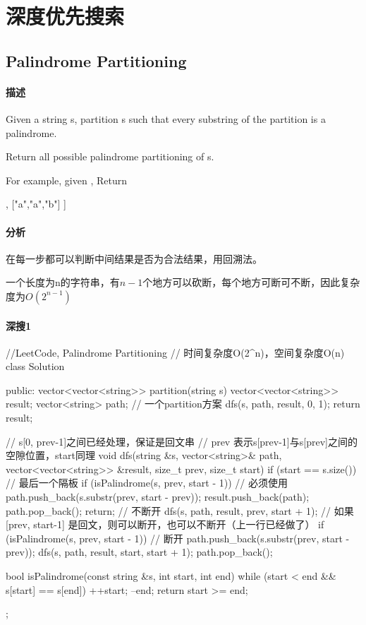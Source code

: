 ﻿\chapter{深度优先搜索}


\section{Palindrome Partitioning} %
\label{sec:palindrome-partitioning}


\subsubsection{描述}
Given a string s, partition s such that every substring of the partition is a palindrome.

Return all possible palindrome partitioning of s.

For example, given ,
Return
\begin{Code}
  [
    ["aa","b"],
    ["a","a","b"]
  ]
\end{Code}


\subsubsection{分析}
在每一步都可以判断中间结果是否为合法结果，用回溯法。

一个长度为n的字符串，有$n-1$个地方可以砍断，每个地方可断可不断，因此复杂度为$O(2^{n-1})$


\subsubsection{深搜1}
\begin{Code}
//LeetCode, Palindrome Partitioning
// 时间复杂度O(2^n)，空间复杂度O(n)
class Solution {
public:
    vector<vector<string>> partition(string s) {
        vector<vector<string>> result;
        vector<string> path;  // 一个partition方案
        dfs(s, path, result, 0, 1);
        return result;
    }

    // s[0, prev-1]之间已经处理，保证是回文串
    // prev 表示s[prev-1]与s[prev]之间的空隙位置，start同理
    void dfs(string &s, vector<string>& path,
            vector<vector<string>> &result, size_t prev, size_t start) {
        if (start == s.size()) { // 最后一个隔板
            if (isPalindrome(s, prev, start - 1)) { // 必须使用
                path.push_back(s.substr(prev, start - prev));
                result.push_back(path);
                path.pop_back();
            }
            return;
        }
        // 不断开
        dfs(s, path, result, prev, start + 1);
        // 如果[prev, start-1] 是回文，则可以断开，也可以不断开（上一行已经做了）
        if (isPalindrome(s, prev, start - 1)) {
            // 断开
            path.push_back(s.substr(prev, start - prev));
            dfs(s, path, result, start, start + 1);
            path.pop_back();
        }
    }

    bool isPalindrome(const string &s, int start, int end) {
        while (start < end && s[start] == s[end]) {
            ++start;
            --end;
        }
        return start >= end;
    }
};
\end{Code}


